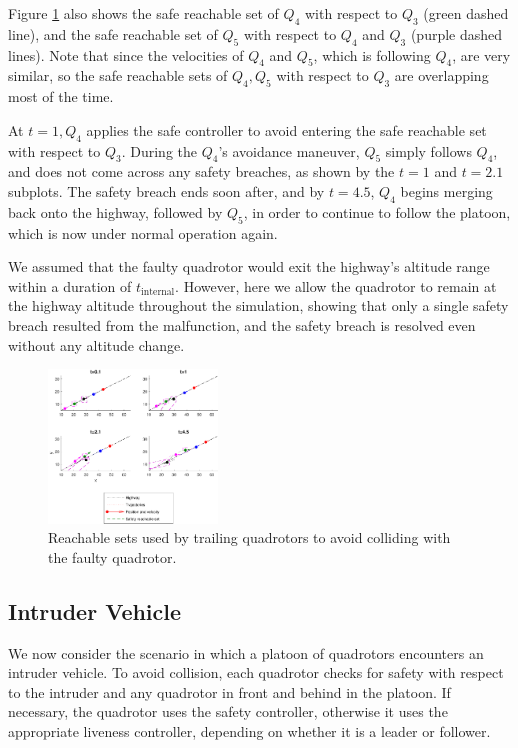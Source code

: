 Figure \ref{fig:faulty2} also shows the safe reachable set of $Q_4$ with respect to $Q_3$ (green dashed line), and the safe reachable set of $Q_5$ with respect to $Q_4$ and $Q_3$ (purple dashed lines). Note that since the velocities of $Q_4$ and $Q_5$, which is following $Q_4$, are very similar, so the safe reachable sets of $Q_4,Q_5$ with respect to $Q_3$ are overlapping most of the time. 

At $t=1,Q_4$ applies the safe controller to avoid entering the safe reachable set with respect to $Q_3$. During the $Q_4$'s avoidance maneuver, $Q_5$ simply follows $Q_4$, and does not come across any safety breaches, as shown by the $t=1$ and $t=2.1$ subplots. The safety breach ends soon after, and by $t=4.5$, $Q_4$ begins merging back onto the highway, followed by $Q_5$, in order to continue to follow the platoon, which is now under normal operation again.

We assumed that the faulty quadrotor would exit the highway's altitude range within a duration of $t_\text{internal}$. However, here we allow the quadrotor to remain at the highway altitude throughout the simulation, showing that only a single safety breach resulted from the malfunction, and the safety breach is resolved even without any altitude change.


\begin{figure}
	\center
		\includegraphics[width=0.4\textwidth]{fig/faultyRsets}
		\caption{Reachable sets used by trailing quadrotors to avoid colliding with the faulty quadrotor.}
		\label{fig:faulty2}
\end{figure}

\subsection{Intruder Vehicle}
We now consider the scenario in which a platoon of quadrotors encounters an intruder vehicle. To avoid collision, each quadrotor checks for safety with respect to the intruder and any quadrotor in front and behind in the platoon. If necessary, the quadrotor uses the safety controller, otherwise it uses the appropriate liveness controller, depending on whether it is a leader or follower.

